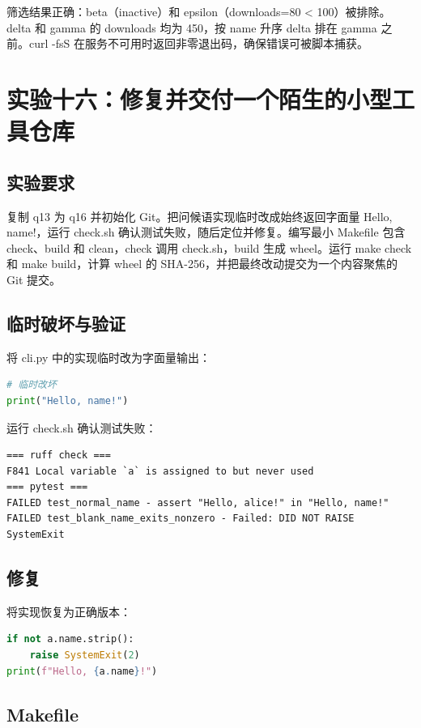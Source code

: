 \documentclass[UTF8]{ctexart}
\begin{document}
筛选结果正确：beta（inactive）和 epsilon（downloads=80 < 100）被排除。delta 和 gamma 的 downloads 均为 450，按 name 升序 delta 排在 gamma 之前。curl -fsS 在服务不可用时返回非零退出码，确保错误可被脚本捕获。

\section{实验十六：修复并交付一个陌生的小型工具仓库}

\subsection{实验要求}

复制 q13 为 q16 并初始化 Git。把问候语实现临时改成始终返回字面量 Hello, name!，运行 check.sh 确认测试失败，随后定位并修复。编写最小 Makefile 包含 check、build 和 clean，check 调用 check.sh，build 生成 wheel。运行 make check 和 make build，计算 wheel 的 SHA-256，并把最终改动提交为一个内容聚焦的 Git 提交。

\subsection{临时破坏与验证}

将 cli.py 中的实现临时改为字面量输出：

\begin{lstlisting}[language=Python]
# 临时改坏
print("Hello, name!")
\end{lstlisting}

运行 check.sh 确认测试失败：

\begin{lstlisting}
=== ruff check ===
F841 Local variable `a` is assigned to but never used
=== pytest ===
FAILED test_normal_name - assert "Hello, alice!" in "Hello, name!"
FAILED test_blank_name_exits_nonzero - Failed: DID NOT RAISE SystemExit
\end{lstlisting}

\subsection{修复}

将实现恢复为正确版本：

\begin{lstlisting}[language=Python]
if not a.name.strip():
    raise SystemExit(2)
print(f"Hello, {a.name}!")
\end{lstlisting}

\subsection{Makefile}
\end{document}
